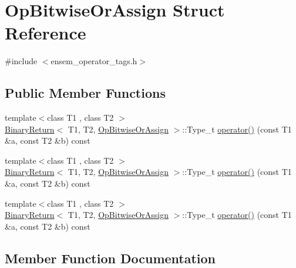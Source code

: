 \hypertarget{structOpBitwiseOrAssign}{}\section{Op\+Bitwise\+Or\+Assign Struct Reference}
\label{structOpBitwiseOrAssign}


{\ttfamily \#include $<$ensem\+\_\+operator\+\_\+tags.\+h$>$}

\subsection*{Public Member Functions}
\begin{DoxyCompactItemize}
\item 
{\footnotesize template$<$class T1 , class T2 $>$ }\\\mbox{\hyperlink{structBinaryReturn}{Binary\+Return}}$<$ T1, T2, \mbox{\hyperlink{structOpBitwiseOrAssign}{Op\+Bitwise\+Or\+Assign}} $>$\+::Type\+\_\+t \mbox{\hyperlink{structOpBitwiseOrAssign_abdf5c9f46dce33611878cf271e3b7a09}{operator()}} (const T1 \&a, const T2 \&b) const
\item 
{\footnotesize template$<$class T1 , class T2 $>$ }\\\mbox{\hyperlink{structBinaryReturn}{Binary\+Return}}$<$ T1, T2, \mbox{\hyperlink{structOpBitwiseOrAssign}{Op\+Bitwise\+Or\+Assign}} $>$\+::Type\+\_\+t \mbox{\hyperlink{structOpBitwiseOrAssign_abdf5c9f46dce33611878cf271e3b7a09}{operator()}} (const T1 \&a, const T2 \&b) const
\item 
{\footnotesize template$<$class T1 , class T2 $>$ }\\\mbox{\hyperlink{structBinaryReturn}{Binary\+Return}}$<$ T1, T2, \mbox{\hyperlink{structOpBitwiseOrAssign}{Op\+Bitwise\+Or\+Assign}} $>$\+::Type\+\_\+t \mbox{\hyperlink{structOpBitwiseOrAssign_abdf5c9f46dce33611878cf271e3b7a09}{operator()}} (const T1 \&a, const T2 \&b) const
\end{DoxyCompactItemize}


\subsection{Member Function Documentation}
\mbox{\label{structOpBitwiseOrAssign_abdf5c9f46dce33611878cf271e3b7a09}} 
